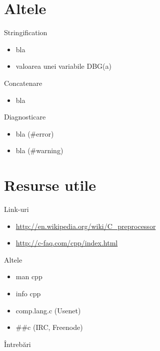 \documentclass{beamer}
\begin{document}
\section{Altele}

\frame{\tableofcontents[currentsection]}

\begin{frame}{Stringification}
  \begin{itemize}
    \item bla
    \item valoarea unei variabile DBG(a)
  \end{itemize}
\end{frame}

\begin{frame}{Concatenare}
  \begin{itemize}
    \item bla
  \end{itemize}
\end{frame}

\begin{frame}{Diagnosticare}
  \begin{itemize}
    \item bla (\#error)
    \item bla (\#warning)
  \end{itemize}
\end{frame}

\section{Resurse utile}

\frame{\tableofcontents[currentsection]}

\begin{frame}{Link-uri}
  \begin{itemize}
    \item \url{http://en.wikipedia.org/wiki/C\_preprocessor}
    \item \url{http://c-faq.com/cpp/index.html}
  \end{itemize}
\end{frame}

\begin{frame}{Altele}
  \begin{itemize}
    \item man cpp
    \item info cpp
    \item comp.lang.c (Usenet)
    \item \#\#c (IRC, Freenode)
  \end{itemize}
\end{frame}

\begin{frame}{Întrebări}
\end{frame}
\end{document}
